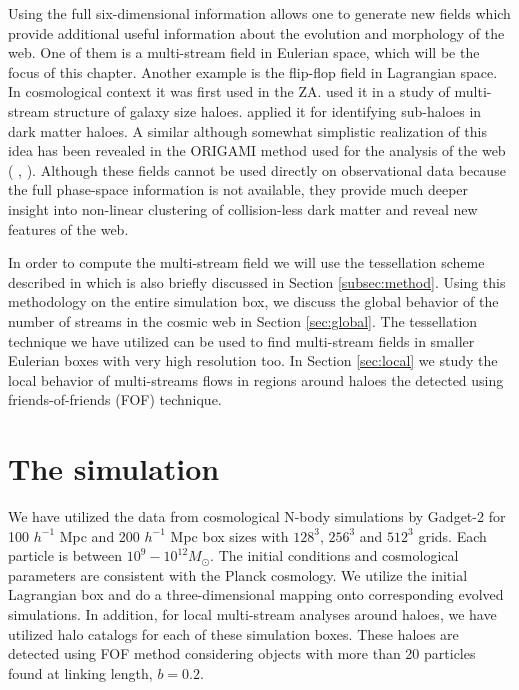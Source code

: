 Using the full six-dimensional information allows one to generate new fields which  provide 
additional useful information about the evolution and morphology of the  web. 
One of them is a multi-stream field in Eulerian space, which will be the focus of this chapter. 
Another example is the flip-flop field in Lagrangian space. In cosmological context it was first used in the ZA.
\citet{Vogelsberger2011} used it in a study of multi-stream structure of galaxy size haloes.
\citet{Shandarin2014a} applied it for identifying sub-haloes  in dark matter haloes.
A similar although somewhat simplistic realization of this idea has been revealed in the ORIGAMI method
used for the analysis of the web ( \citealt{Falck2012},  \citealt{Falck2015} ).
 Although these fields cannot be used directly on observational data because the full phase-space information
 is not available, they provide much deeper insight into non-linear clustering of collision-less dark matter
and reveal new features of the web.


In order to compute the multi-stream field we will use the tessellation scheme described in
 \citet{Shandarin2012} which is  also briefly discussed in Section \ref{subsec:method}.
  Using this methodology on the entire simulation box, we discuss the global behavior of the number of streams in the cosmic web in Section \ref{sec:global}. 
  The tessellation technique we have utilized can be used to find multi-stream fields in smaller Eulerian boxes with very high resolution too. In Section \ref{sec:local} we study the local behavior of multi-streams flows in regions around haloes the detected using friends-of-friends (FOF) technique.
 
 


\section{The simulation}
\label{sec:simulation}


We have utilized the data from cosmological N-body simulations by Gadget-2 \citep{Springel2005c} for 100 $h^{-1}$ Mpc  and 200 $h^{-1}$ Mpc box 
sizes with $128^3$, $256^3$ and $512^3$ grids. Each particle is between  $10^9 - 10^{12} M_{\odot}$. 
The initial conditions and cosmological parameters are consistent with the Planck cosmology. We utilize the initial Lagrangian box and do a three-dimensional mapping onto corresponding evolved simulations. In addition, for local multi-stream analyses around haloes, we have utilized halo catalogs for each of these simulation boxes. These haloes are detected using FOF method considering objects with more than 20 particles found at linking length, $ b= 0.2$.  
